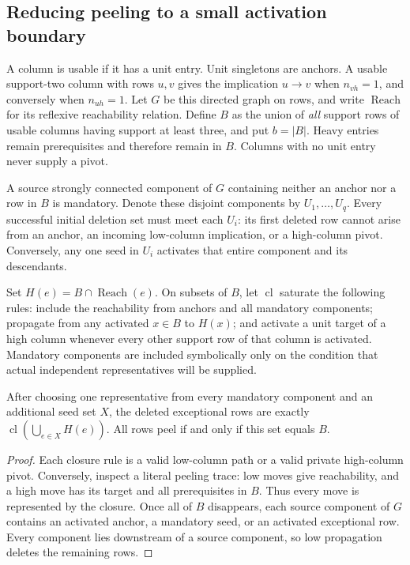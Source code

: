 \subsection{Reducing peeling to a small activation boundary}

A column is usable if it has a unit entry.  Unit singletons are anchors.
A usable support-two column with rows $u,v$ gives the implication
$u\longrightarrow v$ when $n_{vh}=1$, and conversely when $n_{uh}=1$.
Let $G$ be this directed graph on rows, and write $\operatorname{Reach}$
for its reflexive reachability relation.  Define $B$ as the union of
\emph{all} support rows of usable columns having support at least three,
and put $b=|B|$.  Heavy entries remain prerequisites and therefore remain
in $B$.  Columns with no unit entry never supply a pivot.

A source strongly connected component of $G$ containing neither an
anchor nor a row in $B$ is mandatory.  Denote these disjoint components
by $U_1,\ldots,U_q$.  Every successful initial deletion set must meet
each $U_i$: its first deleted row cannot arise from an anchor, an incoming
low-column implication, or a high-column pivot.  Conversely, any one
seed in $U_i$ activates that entire component and its descendants.

Set $H(e)=B\cap\operatorname{Reach}(e)$.  On subsets of $B$, let
$\operatorname{cl}$ saturate the following rules: include the reachability
from anchors and all mandatory components; propagate from any activated
$x\in B$ to $H(x)$; and activate a unit target of a high column whenever
every other support row of that column is activated.  Mandatory components
are included symbolically only on the condition that actual independent
representatives will be supplied.

\begin{proposition}
After choosing one representative from every mandatory component and an
additional seed set $X$, the deleted exceptional rows are exactly
$\operatorname{cl}(\bigcup_{e\in X}H(e))$.  All rows peel if and only
if this set equals $B$.
\end{proposition}
\begin{proof}
Each closure rule is a valid low-column path or a valid private high-column
pivot.  Conversely, inspect a literal peeling trace: low moves give
reachability, and a high move has its target and all prerequisites in $B$.
Thus every move is represented by the closure.  Once all of $B$ disappears,
each source component of $G$ contains an activated anchor, a mandatory seed,
or an activated exceptional row.  Every component lies downstream of a
source component, so low propagation deletes the remaining rows.
\end{proof}

